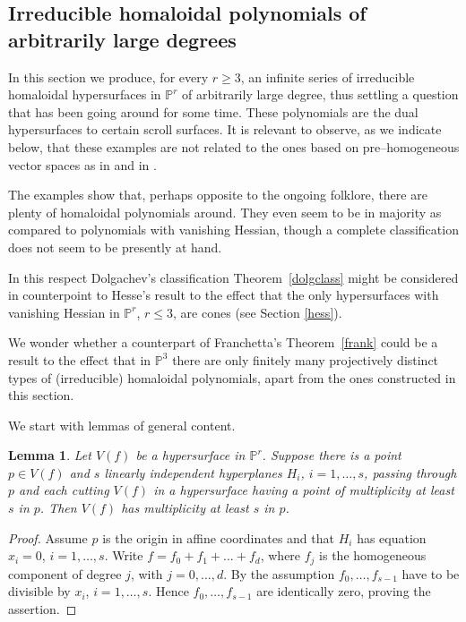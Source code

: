 \documentclass[11pt]{article}   %
\newtheorem{Lemma}[Theorem]{Lemma}
\theoremstyle{definition}
\numberwithin{Theorem}{section} \numberwithin{equation}{section}
\newcommand{\p}{{\mathbb P}}
\begin{document}
{\subsection{Irreducible homaloidal polynomials of arbitrarily large degrees}\label
{infser}

In this section we produce, for every  $r\geq 3$, an infinite series
of irreducible homaloidal hypersurfaces in $\p^ r$ of arbitrarily
large degree, thus settling a question that has been going around
for some time. These polynomials are the dual hypersurfaces to
certain scroll surfaces. It is relevant to observe, as we indicate
below, that these examples are not related to the ones based on
pre--homogeneous vector spaces as in \cite{EKP} and in \cite{ESB}.

The examples show that, perhaps opposite to the ongoing folklore,
there are plenty of homaloidal polynomials around. They even seem to
be in majority as compared to polynomials with vanishing Hessian,
though a complete classification does not seem to be presently at
hand.

In this respect Dolgachev's classification Theorem~\ref{dolgclass}
might be considered in counterpoint to Hesse's result to the effect
that the only hypersurfaces with vanishing Hessian in $\p^ r$,
$r\leq 3$,  are cones (see { Section}
\ref {hess}).

We wonder whether a counterpart of Franchetta's Theorem~\ref{frank}
could be a result to the effect that in $\p^ 3$ there are only
finitely many projectively distinct types of (irreducible)
homaloidal polynomials, apart from the ones constructed in this
section.

\medskip

We start with lemmas of general content.

\begin{Lemma}\label{lem:ess} Let $V(f)$ be a hypersurface in $\p^ r$.
Suppose there is  a point  $p\in V(f)$ and $s$ linearly independent hyperplanes
$H_i$, $i=1,\dots,s$, passing through $p$ and each cutting $V(f)$ in a hypersurface
having a point of multiplicity at least $s$ in $p$. Then $V(f)$ has multiplicity at
least $s$ in $p$.
\end{Lemma}

\begin{proof} Assume $p$ is the origin in affine coordinates and that $H_i$ has
equation $x_i=0$, $i=1,\dots,s$. Write $f=f_0+f_1+\dots+f_d$, where $f_j$
is the homogeneous component of degree $j$, with $j=0,\dots,d$.
By the assumption $f_0,\dots,f_{s-1}$ have to
be divisible by $x_i$, $i=1,\dots,s$. Hence $f_0,\dots,f_{s-1}$ are identically zero,
proving the assertion.\end{proof}

}
\end{document}
